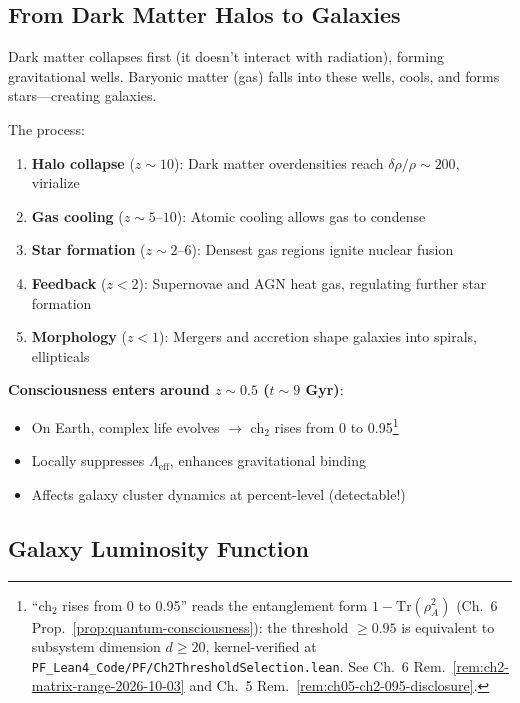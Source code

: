 \subsection{From Dark Matter Halos to Galaxies}

\begin{intuitive}
Dark matter collapses first (it doesn't interact with radiation), forming gravitational wells. Baryonic matter (gas) falls into these wells, cools, and forms stars—creating galaxies\cite{white1978,blumenthal1984}.

The process:
\begin{enumerate}
\item \textbf{Halo collapse} ($z \sim 10$): Dark matter overdensities reach $\delta \rho / \rho \sim 200$, virialize
\item \textbf{Gas cooling} ($z \sim 5\text{--}10$): Atomic cooling allows gas to condense
\item \textbf{Star formation} ($z \sim 2\text{--}6$): Densest gas regions ignite nuclear fusion
\item \textbf{Feedback} ($z < 2$): Supernovae and AGN heat gas, regulating further star formation
\item \textbf{Morphology} ($z < 1$): Mergers and accretion shape galaxies into spirals, ellipticals
\end{enumerate}

\textbf{Consciousness enters around $z \sim 0.5$ ($t \sim 9$ Gyr)}:
\begin{itemize}
\item On Earth, complex life evolves $\to$ ch$_2$ rises from 0 to 0.95\footnote{``ch$_2$ rises from 0 to 0.95'' reads the entanglement form $1 - \mathrm{Tr}(\rho_A^2)$ (Ch.~6 Prop.~\ref{prop:quantum-consciousness}): the threshold $\geq 0.95$ is equivalent to subsystem dimension $d \geq 20$, kernel-verified at \texttt{PF\_Lean4\_Code/PF/Ch2ThresholdSelection.lean}. See Ch.~6 Rem.~\ref{rem:ch2-matrix-range-2026-10-03} and Ch.~5 Rem.~\ref{rem:ch05-ch2-095-disclosure}.}
\item Locally suppresses $\Lambda_{\text{eff}}$, enhances gravitational binding
\item Affects galaxy cluster dynamics at percent-level (detectable!)
\end{itemize}
\end{intuitive}

\subsection{Galaxy Luminosity Function}

